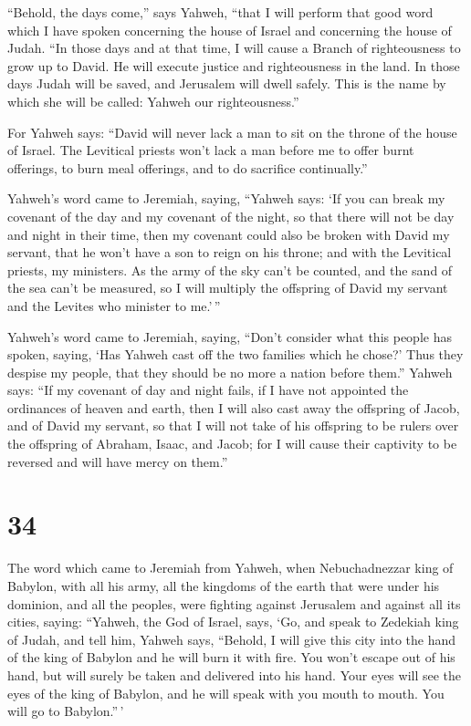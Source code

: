  ``Behold, the days come,'' says Yahweh, ``that I will
perform that good word which I have spoken concerning the house of
Israel and concerning the house of Judah.  ``In those
days and at that time, I will cause a Branch of righteousness to grow up
to David. He will execute justice and righteousness in the land.
 In those days Judah will be saved, and Jerusalem will
dwell safely. This is the name by which she will be called: Yahweh our
righteousness.''

 For Yahweh says: ``David will never lack a man to sit on
the throne of the house of Israel.  The Levitical priests
won't lack a man before me to offer burnt offerings, to burn meal
offerings, and to do sacrifice continually.''

 Yahweh's word came to Jeremiah, saying, 
``Yahweh says: `If you can break my covenant of the day and my covenant
of the night, so that there will not be day and night in their time,
 then my covenant could also be broken with David my
servant, that he won't have a son to reign on his throne; and with the
Levitical priests, my ministers.  As the army of the sky
can't be counted, and the sand of the sea can't be measured, so I will
multiply the offspring of David my servant and the Levites who minister
to me.'\,''

 Yahweh's word came to Jeremiah, saying, 
``Don't consider what this people has spoken, saying, `Has Yahweh cast
off the two families which he chose?' Thus they despise my people, that
they should be no more a nation before them.''  Yahweh
says: ``If my covenant of day and night fails, if I have not appointed
the ordinances of heaven and earth,  then I will also
cast away the offspring of Jacob, and of David my servant, so that I
will not take of his offspring to be rulers over the offspring of
Abraham, Isaac, and Jacob; for I will cause their captivity to be
reversed and will have mercy on them.''

\hypertarget{section-33}{%
\section{34}\label{section-33}}

 The word which came to Jeremiah from Yahweh, when
Nebuchadnezzar king of Babylon, with all his army, all the kingdoms of
the earth that were under his dominion, and all the peoples, were
fighting against Jerusalem and against all its cities, saying:
 ``Yahweh, the God of Israel, says, `Go, and speak to
Zedekiah king of Judah, and tell him, Yahweh says, ``Behold, I will give
this city into the hand of the king of Babylon and he will burn it with
fire.  You won't escape out of his hand, but will surely
be taken and delivered into his hand. Your eyes will see the eyes of the
king of Babylon, and he will speak with you mouth to mouth. You will go
to Babylon.''\,'

